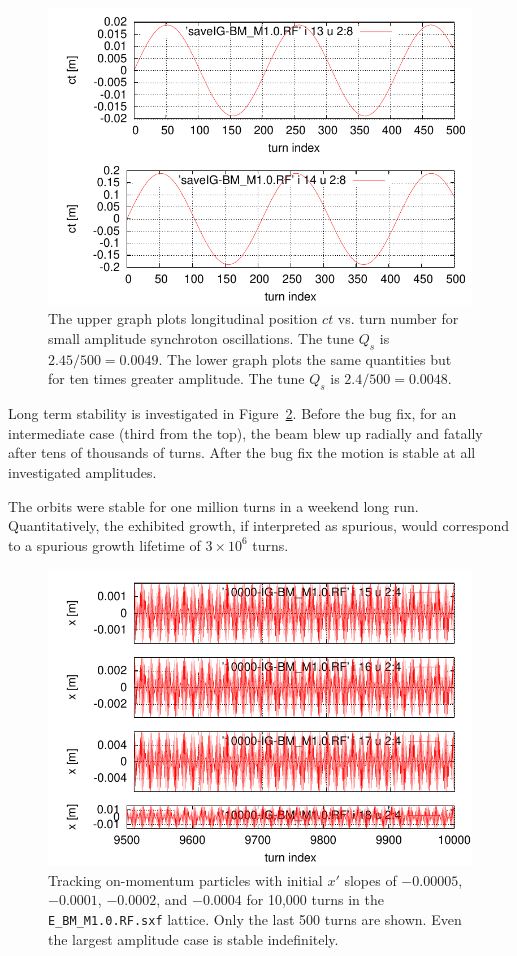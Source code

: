 \documentclass[]{article}
\begin{document}
\begin{figure}[h]
\centering
\includegraphics[scale=0.8]{pdf/Q_sVsSynchAmplitude.pdf}
\caption{\label{fig:Q_sVsSynchAmplitude}The upper graph
plots longitudinal position $ct$ vs. turn number for
small amplitude synchroton oscillations. The tune $Q_s$
is $2.45/500=0.0049$. The lower graph
plots the same quantities but for ten times greater
amplitude. The tune $Q_s$ is $2.4/500=0.0048$. 
}
\end{figure}
%

\clearpage

Long term stability is investigated in Figure~\ref{fig:LongTerm_x_M1.0}.
Before the bug fix, for an intermediate case (third from the top), the 
beam blew up radially and fatally after tens of thousands of turns. 
After the bug fix the motion is stable at all investigated amplitudes.

The orbits were stable for one million turns in a weekend long
run. Quantitatively, the exhibited growth, if
interpreted as spurious, would correspond to a spurious growth lifetime
of $3\times10^6$ turns.
%
\begin{figure}[h]
\centering
\includegraphics[scale=1.3]{pdf/LongTerm_x_M1p0.pdf}
\caption{\label{fig:LongTerm_x_M1.0}Tracking on-momentum particles
with initial $x'$ slopes of $-0.00005$, $-0.0001$, $-0.0002$,  
and $-0.0004$ for 10,000 turns in the {\tt E\_BM\_M1.0.RF.sxf} 
lattice. Only the last 500 turns are shown. Even the largest
amplitude case is stable indefinitely.
}
\end{figure}
%
\end{document}
